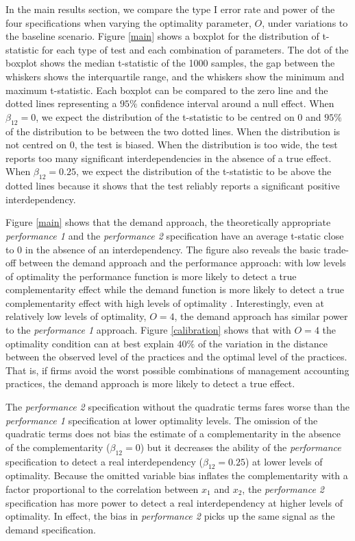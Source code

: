 \documentclass[12pt]{article}
\begin{document}
In the main results section, we compare the type I error rate and power of the four specifications when varying the optimality parameter, $O$, under variations to the baseline scenario. Figure \ref{main} shows a boxplot for the distribution of t-statistic for each type of test and each combination of parameters. The dot of the boxplot shows the median t-statistic of the 1000 samples, the gap between the whiskers shows the interquartile range, and the whiskers show the minimum and maximum t-statistic. Each boxplot can be compared to the zero line and the dotted lines representing a $95\%$ confidence interval around a null effect. When $\beta_{12} = 0$, we expect the distribution of the t-statistic to be centred on $0$ and $95\%$ of the distribution to be between the two dotted lines. When the distribution is not centred on $0$, the test is biased. When the distribution is too wide, the test reports too many significant interdependencies in the absence of a true effect. When $\beta_{12} = 0.25$, we expect the distribution of the t-statistic to be above the dotted lines because it shows that the test reliably reports a significant positive interdependency.

Figure \ref{main} shows that the demand approach, the theoretically appropriate \emph{performance 1} and the \emph{performance 2} specification have an average t-static close to 0 in the absence of an interdependency. The figure also reveals the basic trade-off between the demand approach and the performance approach: with low levels of optimality the performance function is more likely to detect a true complementarity effect while the demand function is more likely to detect a true complementarity effect with high levels of optimality \citep{grabner_management_2013, aral_three-way_2012, johansson_testing_2018}. Interestingly, even at relatively low levels of optimality, $O = 4$, the demand approach has similar power to the \emph{performance 1} approach. Figure \ref{calibration} shows that with $O=4$ the optimality condition can at best explain $40\%$ of the variation in the distance between the observed level of the practices and the optimal level of the practices. That is, if firms avoid the worst possible combinations of management accounting practices, the demand approach is more likely to detect a true effect.

The \emph{performance 2} specification without the quadratic terms fares worse than the \emph{performance 1} specification at lower optimality levels. The omission of the quadratic terms does not bias the estimate of a complementarity in the absence of the complementarity ($\beta_{12} = 0$) but it decreases the ability of the \emph{performance} specification to detect a real interdependency ($\beta_{12} = 0.25$) at lower levels of optimality. Because the omitted variable bias inflates the complementarity with a factor proportional to the correlation between $x_1$ and $x_2$, the \emph{performance 2} specification has more power to detect a real interdependency at higher levels of optimality. In effect, the bias in \emph{performance 2} picks up the same signal as the demand specification.
\end{document}
